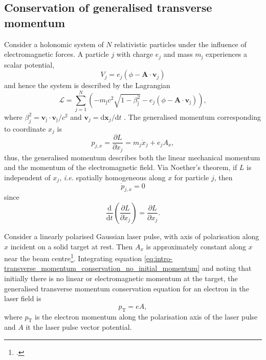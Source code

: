 \subsection{Conservation of generalised transverse momentum}\label{sec:intro_conservation-generalised-mometum}
Consider a holonomic system of $N$ relativistic particles under the influence of electromagnetic forces. A particle $j$ with charge $e_j$ and mass $m_\mathrm{j}$ experiences a scalar potential,
\begin{equation}
		V_{j} = e_j(\phi - \mathbf{A} \cdot \mathbf{v}_{j})
\end{equation}
and hence the system is described by the Lagrangian
\begin{equation}
	\mathcal{L} = \sum^N_{j=1}\left( - m_\mathrm{j}c^2\sqrt{1-\beta^2_\mathrm{j}} - e_j(\phi - \mathbf{A} \cdot \mathbf{v}_\mathrm{j}) \right),
\end{equation}
where $\beta^2_j = \mathbf{v}_\mathrm{j}\cdot\mathbf{v}_\mathrm{j} /c^2$ and $\mathbf{v}_j = \mathrm{d}\mathbf{x}_j/\mathrm{d}t$ \cite{goldsteinClassicalMechanics2013}.
The generalised momentum corresponding to coordinate $x_j$ is
\begin{equation}
	p_{j,x} = \frac{\partial L}{\partial \dot{x}_j} = m_j\dot{x}_j + e_jA_x,
\end{equation}
thus, the generalised momentum describes both the linear mechanical momentum and the momentum of the electromagnetic field. Via Noether's theorem, if $L$ is independent of $x_j$, \textit{i.e.} spatially homogeneous along $x$ for particle $j$, then 
\begin{equation}\label{eq:intro-transverse_momentum_differential_equation}
	\dot{p}_{j,x} = 0
\end{equation}
since
\begin{equation}
	\frac{\mathrm{d}}{\mathrm{d}t}\left(\frac{\partial L}{\partial \dot{x}_j}\right) = \frac{\partial L}{\partial x_j}.
\end{equation}

Consider a linearly polarised Gaussian laser pulse, with axis of polarisation along $x$ incident on a solid target at rest. Then $A_x$ is approximately constant along $x$ near the beam centre\footcite{Constant relative to the scale of typical electron trajectories in such an interaction.}. Integrating equation \ref{eq:intro-transverse_momentum_conservation_no_initial_momentum} and noting that initially there is no linear or electromagnetic momentum at the target, the generalised transverse momentum conservation equation for an electron in the laser field is
\begin{equation}\label{eq:intro-transverse_momentum_conservation_no_initial_momentum}
	p_\mathrm{T} = eA,
\end{equation}
where $p_\mathrm{T}$ is the electron momentum along the polarisation axis of the laser pulse and $A$ it the laser pulse vector potential.

